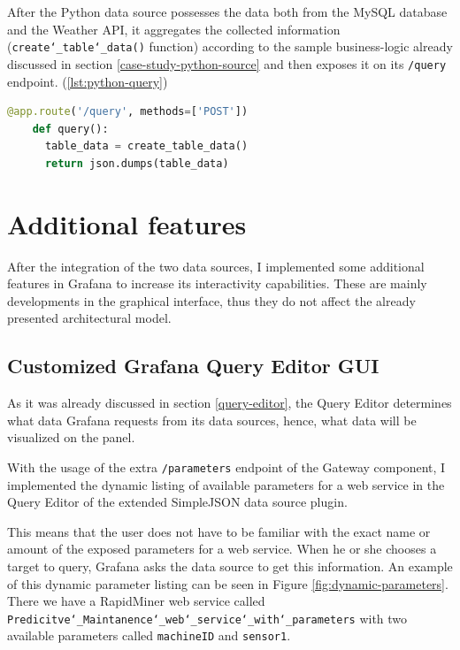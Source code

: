 After the Python data source possesses the data both from the MySQL database and the Weather API, it aggregates the collected information (\texttt{create\char`_table\char`_data()} function) according to the sample business-logic already discussed in section \ref{case-study-python-source} and then exposes it on its \texttt{/query} endpoint. (\ref{lst:python-query})

\begin{minipage}[b]{\linewidth}
	\centering
	\begin{lstlisting}[language=Python, frame=single, mathescape,%
	caption={Exposing the prepared data}, label=lst:python-query]
	@app.route('/query', methods=['POST'])
	def query():
	  table_data = create_table_data()
	  return json.dumps(table_data)
	\end{lstlisting}
\end{minipage}

\section{Additional features}

After the integration of the two data sources, I implemented some additional features in Grafana to increase its interactivity capabilities. These are mainly developments in the graphical interface, thus they do not affect the already presented architectural model.

\subsection{Customized Grafana Query Editor GUI}

As it was already discussed in section \ref{query-editor}, the Query Editor determines what data Grafana requests from its data sources, hence, what data will be visualized on the panel. 

With the usage of the extra \texttt{/parameters} endpoint of the Gateway component, I implemented the dynamic listing of available parameters for a web service in the Query Editor of the extended SimpleJSON data source plugin.

This means that the user does not have to be familiar with the exact name or amount of the exposed parameters for a web service. When he or she chooses a target to query, Grafana asks the data source to get this information. An example of this dynamic parameter listing can be seen in Figure \ref{fig:dynamic-parameters}. There we have a RapidMiner web service called \texttt{Predicitve\char`_Maintanence\char`_web\char`_service\char`_with\char`_parameters} with two available parameters called \texttt{machineID} and \texttt{sensor1}.

